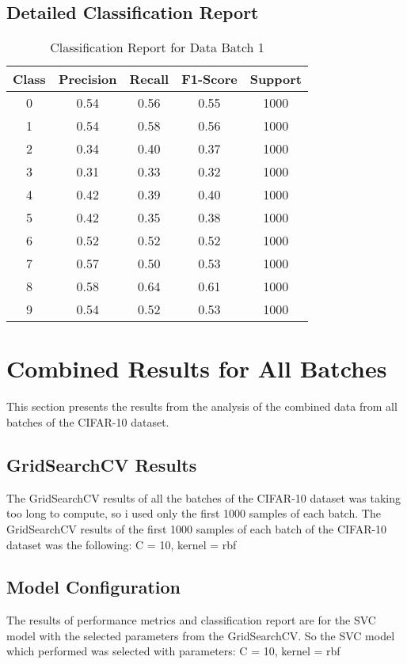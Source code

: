 \documentclass{article}
\begin{document}
\subsection*{Detailed Classification Report}

\begin{table}[H]
\centering
\begin{tabular}{|c|c|c|c|c|}
\hline
\rowcolor[HTML]{ECF4FF} 
\textbf{Class} & \textbf{Precision} & \textbf{Recall} & \textbf{F1-Score} & \textbf{Support} \\ \hline
0 & 0.54 & 0.56 & 0.55 & 1000 \\ \hline
1 & 0.54 & 0.58 & 0.56 & 1000 \\ \hline
2 & 0.34 & 0.40 & 0.37 & 1000 \\ \hline
3 & 0.31 & 0.33 & 0.32 & 1000 \\ \hline
4 & 0.42 & 0.39 & 0.40 & 1000 \\ \hline
5 & 0.42 & 0.35 & 0.38 & 1000 \\ \hline
6 & 0.52 & 0.52 & 0.52 & 1000 \\ \hline
7 & 0.57 & 0.50 & 0.53 & 1000 \\ \hline
8 & 0.58 & 0.64 & 0.61 & 1000 \\ \hline
9 & 0.54 & 0.52 & 0.53 & 1000 \\ \hline
\end{tabular}
\caption*{Classification Report for Data Batch 1}
\end{table}


\section{Combined Results for All Batches}
This section presents the results from the analysis of the combined data from all batches of the CIFAR-10 dataset.


\subsection*{GridSearchCV Results}
The GridSearchCV results of all the batches of the CIFAR-10 dataset was taking too long to compute, so i used only the first 1000 samples of each batch.
The GridSearchCV results of the first 1000 samples of each batch of the CIFAR-10 dataset was the following: {C = 10, kernel = rbf}

\subsection*{Model Configuration}
The results of performance metrics and classification report are for the SVC model with the selected parameters from the GridSearchCV.
So the SVC model which performed was selected with parameters: {C = 10, kernel = rbf}
\end{document}
